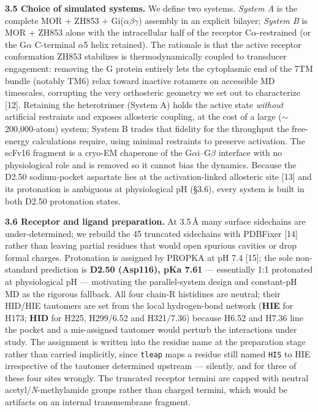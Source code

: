 \documentclass[11pt]{article}
\newcommand{\Ang}{\AA}
\begin{document}
\textbf{3.5 Choice of simulated systems.} We define two systems. \emph{System A} is the complete
MOR + ZH853 + Gi($\alpha\beta\gamma$) assembly in an explicit bilayer; \emph{System B} is
MOR + ZH853 alone with the intracellular half of the receptor C$\alpha$-restrained (or the G$\alpha$ C-terminal
$\alpha$5 helix retained). The rationale is that the active receptor conformation ZH853 stabilizes is
thermodynamically coupled to transducer engagement: removing the G protein entirely lets the
cytoplasmic end of the 7TM bundle (notably TM6) relax toward inactive rotamers on accessible MD
timescales, corrupting the very orthosteric geometry we set out to characterize
[12]. Retaining the heterotrimer (System A) holds the active state
\emph{without} artificial restraints and exposes allosteric coupling, at the cost of a large
($\sim$200{,}000-atom) system; System B trades that fidelity for the throughput the free-energy
calculations require, using minimal restraints to preserve activation. The scFv16 fragment is a
cryo-EM chaperone of the G$\alpha$i--G$\beta$ interface with no physiological role and is removed so it
cannot bias the dynamics. Because the D2.50 sodium-pocket aspartate lies at the activation-linked
allosteric site [13] and its protonation is ambiguous at physiological pH
(\S3.6), every system is built in both D2.50 protonation states.

\textbf{3.6 Receptor and ligand preparation.} At 3.5\,\Ang{} many surface sidechains are
under-determined; we rebuild the 45 truncated sidechains with PDBFixer [14] rather
than leaving partial residues that would open spurious cavities or drop formal charges. Protonation is
assigned by PROPKA at pH 7.4 [15]; the sole non-standard prediction is \textbf{D2.50
(Asp116), pKa 7.61} --- essentially 1:1 protonated at physiological pH --- motivating the parallel-system
design and constant-pH MD as the rigorous fallback. All four chain-R histidines are neutral; their
HID/HIE tautomers are set from the local hydrogen-bond network (\textbf{HIE} for H173; \textbf{HID}
for H225, H299/6.52 and H321/7.36) because H6.52 and H7.36 line the pocket and a mis-assigned tautomer
would perturb the interactions under study. The assignment is written into the residue name at the
preparation stage rather than carried implicitly, since \texttt{tleap} maps a residue still named
\texttt{HIS} to HIE irrespective of the tautomer determined upstream --- silently, and for three of
these four sites wrongly. The truncated receptor termini
are capped with neutral acetyl/\emph{N}-methylamide groups rather than charged termini, which would be
artifacts on an internal transmembrane fragment.
\end{document}
